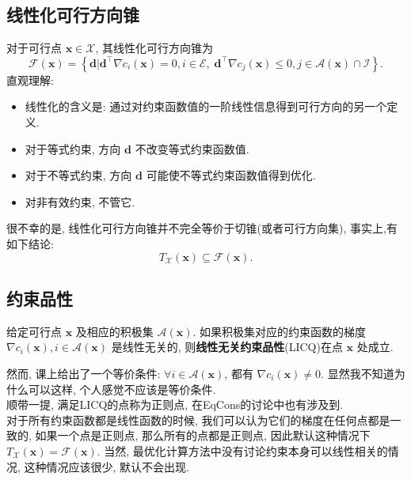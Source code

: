 \documentclass[lang = cn]{elegantpaper}
\begin{document}
\subsection{线性化可行方向锥}
\noindent
对于可行点 $\bm{x} \in \mathcal{X}$, 其线性化可行方向锥为
\begin{equation*}
    \mathcal{F}(\bm{x}) = \left\{\bm{d}|\bm{d}^\top\nabla c_i(\bm{x})=0,i\in\mathcal{E},\; \bm{d}^\top\nabla c_j(\bm{x})\le0,j\in\mathcal{A}(\bm{x})\cap \mathcal{I}\right\}.
\end{equation*}
直观理解:
\begin{itemize}
    \item 线性化的含义是: 通过对约束函数值的一阶线性信息得到可行方向的另一个定义.
    \item 对于等式约束, 方向 $\bm{d}$ 不改变等式约束函数值.
    \item 对于不等式约束, 方向 $\bm{d}$ 可能使不等式约束函数值得到优化.
    \item 对非有效约束, 不管它.
\end{itemize}
很不幸的是, 线性化可行方向锥并不完全等价于切锥(或者可行方向集), 事实上,有如下结论:
\begin{equation*}
    T_{\mathcal{X}}(\bm{x}) \subseteq \mathcal{F}(\bm{x}).
\end{equation*}
\subsection{约束品性}
\begin{definition}
    给定可行点 $\bm{x}$ 及相应的积极集 $\mathcal{A}(\bm{x})$. 如果积极集对应的约束函数的梯度 $\nabla c_i(\bm{x}), i\in\mathcal{A}(\bm{x})$ 是线性无关的, 则\textbf{线性无关约束品性}(LICQ)在点 $\bm{x}$ 处成立.
\end{definition}
\noindent
然而, 课上给出了一个等价条件: $\forall i\in \mathcal{A}(\bm{x})$, 都有 $\nabla c_i(\bm{x}) \neq 0$. 显然我不知道为什么可以这样, 个人感觉不应该是等价条件.\\
顺带一提, 满足LICQ的点称为正则点, 在EqCons的讨论中也有涉及到.\\
对于所有约束函数都是线性函数的时候, 我们可以认为它们的梯度在任何点都是一致的, 如果一个点是正则点, 那么所有的点都是正则点, 因此默认这种情况下 $T_\mathcal{X}(\bm{x}) = \mathcal{F}(\bm{x})$. 当然, 最优化计算方法中没有讨论约束本身可以线性相关的情况, 这种情况应该很少, 默认不会出现.
\end{document}
